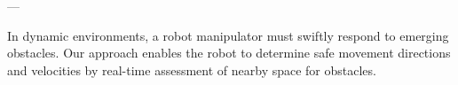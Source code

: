 \documentclass[letterpaper, 10 pt, conference]{ieeeconf}  %
\begin{document}
%
%
%
%



\alert{---}

In dynamic environments, a robot manipulator must swiftly respond to emerging obstacles. Our approach enables the robot to determine safe movement directions and velocities by real-time assessment of nearby space for obstacles.
\end{document}

